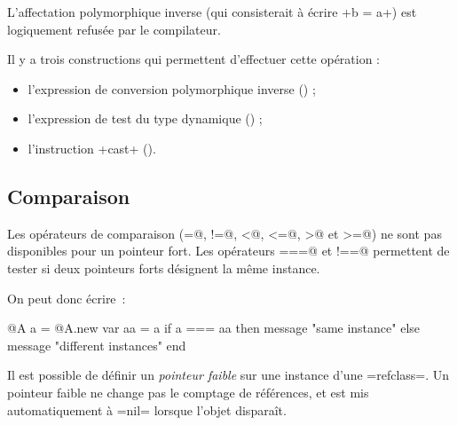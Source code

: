 L'affectation polymorphique inverse (qui consisterait à écrire \ggst+b = a+) est logiquement refusée par le compilateur.

Il y a trois constructions qui permettent d'effectuer cette opération :
\begin{itemize}
  \item l'expression de conversion polymorphique inverse () ;
  \item l'expression de test du type dynamique () ;
  \item l'instruction \ggst+cast+ ().
\end{itemize}

%


\subsection{Comparaison}

Les opérateurs de comparaison (\ggst@=@, \ggst@!=@, \ggst@<@, \ggst@<=@, \ggst@>@ et \ggst@>=@) ne sont pas disponibles pour un pointeur fort. Les opérateurs \ggst@===@ et \ggst@!==@ permettent de tester si deux pointeurs forts désignent la même instance.


On peut donc écrire~:
\begin{galgas3}
  @A a = @A.new
  var aa = a
  if a === aa then
    message "same instance\n"
  else
    message "different instances\n"
  end
\end{galgas3}





Il est possible de définir un \emph{pointeur faible} sur une instance d'une \ggst=refclass=. Un pointeur faible ne change pas le comptage de références, et est mis automatiquement à \ggst=nil= lorsque l'objet disparaît.

